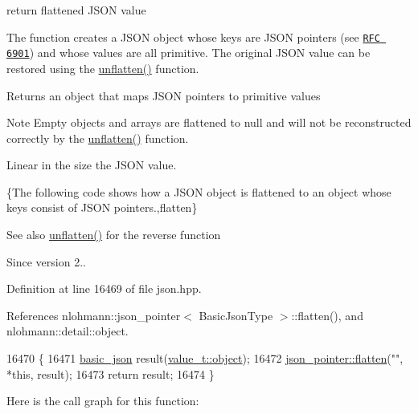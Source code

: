 return flattened J\+S\+ON value 

The function creates a J\+S\+ON object whose keys are J\+S\+ON pointers (see \href{https://tools.ietf.org/html/rfc6901}{\tt R\+FC 6901}) and whose values are all primitive. The original J\+S\+ON value can be restored using the \hyperlink{classnlohmann_1_1basic__json_a74fa3ab2003f2f6f2b69deaafed9126d}{unflatten()} function.

\begin{DoxyReturn}{Returns}
an object that maps J\+S\+ON pointers to primitive values
\end{DoxyReturn}
\begin{DoxyNote}{Note}
Empty objects and arrays are flattened to {\ttfamily null} and will not be reconstructed correctly by the \hyperlink{classnlohmann_1_1basic__json_a74fa3ab2003f2f6f2b69deaafed9126d}{unflatten()} function.
\end{DoxyNote}
Linear in the size the J\+S\+ON value.

\{The following code shows how a J\+S\+ON object is flattened to an object whose keys consist of J\+S\+ON pointers.,flatten\}

\begin{DoxySeeAlso}{See also}
\hyperlink{classnlohmann_1_1basic__json_a74fa3ab2003f2f6f2b69deaafed9126d}{unflatten()} for the reverse function
\end{DoxySeeAlso}
\begin{DoxySince}{Since}
version 2.. 
\end{DoxySince}


Definition at line 16469 of file json.\+hpp.



References nlohmann\+::json\+\_\+pointer$<$ Basic\+Json\+Type $>$\+::flatten(), and nlohmann\+::detail\+::object.


\begin{DoxyCode}
16470     \{
16471         \hyperlink{classnlohmann_1_1basic__json_aed115142bd0c6c66c864700e0467df55}{basic\_json} result(\hyperlink{namespacenlohmann_1_1detail_a1ed8fc6239da25abcaf681d30ace4985aa8cfde6331bd59eb2ac96f8911c4b666}{value\_t::object});
16472         \hyperlink{classnlohmann_1_1json__pointer_ab0d7759d0caa6a0c0187916da28e6ee7}{json\_pointer::flatten}(\textcolor{stringliteral}{""}, *\textcolor{keyword}{this}, result);
16473         \textcolor{keywordflow}{return} result;
16474     \}
\end{DoxyCode}
Here is the call graph for this function\+:
\mbox{\label{classnlohmann_1_1basic__json_aa9be366b887378bb10c0f1ab510c2f0c}} 
